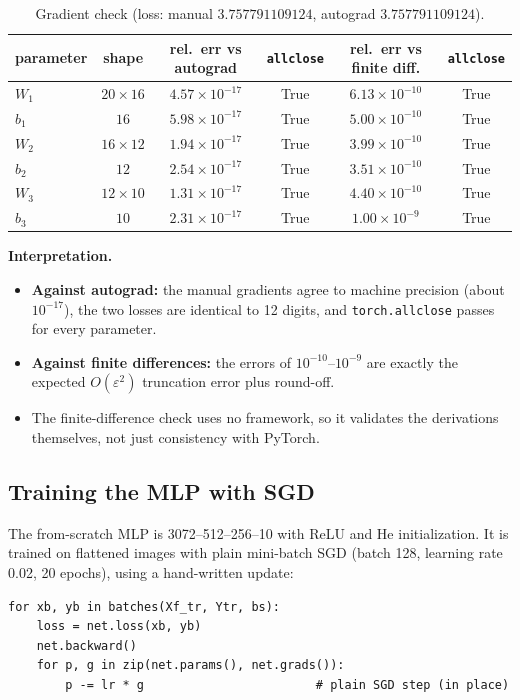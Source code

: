\documentclass[11pt,a4paper]{article}
\begin{document}
\begin{table}[H]
\centering
\caption{Gradient check (loss: manual $3.757791109124$, autograd $3.757791109124$).}
\begin{tabular}{lccccc}
\toprule
parameter & shape & rel.\ err vs autograd & \texttt{allclose} & rel.\ err vs finite diff. & \texttt{allclose}\\
\midrule
$W_1$ & $20\times16$ & $4.57\times10^{-17}$ & True & $6.13\times10^{-10}$ & True\\
$b_1$ & $16$         & $5.98\times10^{-17}$ & True & $5.00\times10^{-10}$ & True\\
$W_2$ & $16\times12$ & $1.94\times10^{-17}$ & True & $3.99\times10^{-10}$ & True\\
$b_2$ & $12$         & $2.54\times10^{-17}$ & True & $3.51\times10^{-10}$ & True\\
$W_3$ & $12\times10$ & $1.31\times10^{-17}$ & True & $4.40\times10^{-10}$ & True\\
$b_3$ & $10$         & $2.31\times10^{-17}$ & True & $1.00\times10^{-9}$  & True\\
\bottomrule
\end{tabular}
\end{table}

\textbf{Interpretation.}
\begin{itemize}
  \item \textbf{Against autograd:} the manual gradients agree to machine precision (about $10^{-17}$), the two losses are identical to 12 digits, and \texttt{torch.allclose} passes for every parameter.
  \item \textbf{Against finite differences:} the errors of $10^{-10}$--$10^{-9}$ are exactly the expected $O(\varepsilon^2)$ truncation error plus round-off.
  \item The finite-difference check uses no framework, so it validates the derivations themselves, not just consistency with PyTorch.
\end{itemize}

\subsection{Training the MLP with SGD}

The from-scratch MLP is 3072--512--256--10 with ReLU and He initialization. It is trained on flattened images with plain mini-batch SGD (batch 128, learning rate 0.02, 20 epochs), using a hand-written update:
\begin{lstlisting}
for xb, yb in batches(Xf_tr, Ytr, bs):
    loss = net.loss(xb, yb)
    net.backward()
    for p, g in zip(net.params(), net.grads()):
        p -= lr * g                        # plain SGD step (in place)
\end{lstlisting}
\end{document}
